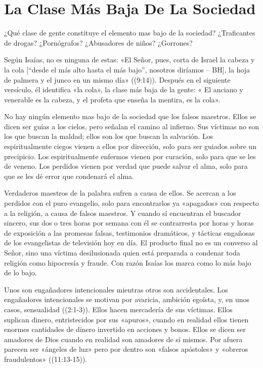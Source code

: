 \documentclass[12pt, twoside, openright]{book}
\begin{document}
\section{La Clase Más Baja De La Sociedad}
¿Qué clase de gente constituye el elemento mas bajo de la sociedad? ¿Traficantes de drogas? ¿Pornógrafos? ¿Abusadores de niños? ¿Gorrones?

Según Isaías, no es ninguna de estas: «El Señor, pues, corta de Israel la cabeza y la cola [“desde el más alto hasta el más bajo”, nosotros diríamos – BH], la hoja de palmera y el junco en un mismo día» ((9:14)). Después en el siguiente versículo, él identifica «la cola», la clase más baja de la gente: « El anciano y venerable es la cabeza, y el profeta que enseña la mentira, es la cola». 

No hay ningún elemento mas bajo de la sociedad que los falsos maestros. Ellos se dicen ser guías a los cielos, pero señalan el camino al infierno. Sus víctimas no son los que buscan la maldad; ellos son los que buscan la salvación. Los espiritualmente ciegos vienen a ellos por dirección, solo para ser guiados sobre un precipicio. Los espiritualmente enfermos vienen por curación, solo para que se les de veneno. Los perdidos vienen por verdad que puede salvar el alma, solo para que se les dé error que condenará el alma.

Verdaderos maestros de la palabra sufren a causa de ellos. Se acercan a los perdidos con el puro evangelio, solo para encontrarlos ya «apagados» con respecto a la religión, a causa de falsos maestros. Y cuando sí encuentran el buscador sincero, sus dos o tres horas por semana con él se contrarresta por horas y horas de exposición a las promesas falsas, testimonios dramáticos, y tácticas engañosas de los evangelistas de televisión hoy en día. El producto final no es un converso al Señor, sino una víctima desilusionada quien está preparada a condenar toda religión como hipocresía y fraude. Con razón Isaías los marca como lo más bajo de lo bajo. 

Unos son engañadores intencionales mientras otros son accidentales. Los engañadores intencionales se motivan por avaricia, ambición egoísta, y, en unos casos, sensualidad ((2:1-3)). Ellos hacen mercadería de sus víctimas. Ellos suplican dinero, entristecidos por sus «apuros», cuando en realidad ellos tienen enormes cantidades de dinero invertido en acciones y bonos. Ellos se dicen ser amadores de Dios cuando en realidad son amadores de sí mismos. Por afuera parecen ser «ángeles de luz» pero por dentro son «falsos apóstoles» y «obreros fraudulentos» ((11:13-15)).
\end{document}
